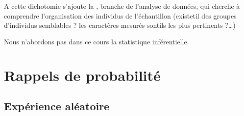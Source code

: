 \documentclass[letterpaper,10pt,french]{sphinxmanual}
\begin{document}
\ignorespaces 
\sphinxAtStartPar
A cette dichotomie s’ajoute la , branche de l’analyse de données, qui cherche à comprendre l’organisation des individus de l’échantillon (existe\sphinxhyphen{}t\sphinxhyphen{}il des groupes d’individus semblables ? les caractères mesurés sont\sphinxhyphen{}ils les plus pertinents ?…)

\sphinxAtStartPar
Nous n’abordons pas dans ce cours la statistique inférentielle.

\sphinxstepscope


\chapter{Rappels de probabilité}
\label{\detokenize{Rappels:rappels-de-probabilite}}\label{\detokenize{Rappels::doc}}

\section{Expérience aléatoire}
\label{\detokenize{Rappels:experience-aleatoire}}
\end{document}
